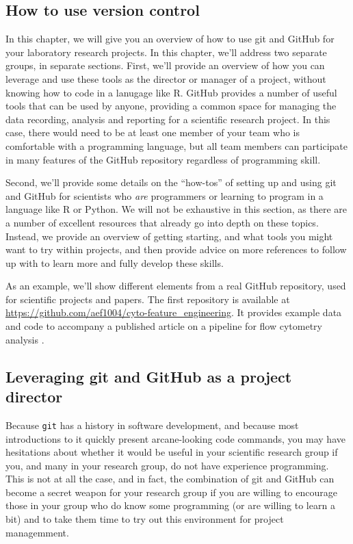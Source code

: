 \documentclass[]{tufte-book}
\begin{document}
\hypertarget{how-to-use-version-control}{%
\subsection{How to use version control}\label{how-to-use-version-control}}

In this chapter, we will give you an overview of how to use git and GitHub
for your laboratory research projects. In this chapter, we'll address two
separate groups, in separate sections. First, we'll provide an overview of how
you can leverage and use these tools as the director or manager of a project,
without knowing how to code in a lanugage like R. GitHub provides a number of
useful tools that can be used by anyone, providing a common space for managing
the data recording, analysis and reporting for a scientific research project.
In this case, there would need to be at least one member of your team who is
comfortable with a programming language, but all team members can participate
in many features of the GitHub repository regardless of programming skill.

Second, we'll provide some details on the ``how-tos'' of setting up and using
git and GitHub for scientists who \emph{are} programmers or learning to program in
a language like R or Python. We will not be exhaustive in this section, as there
are a number of excellent resources that already go into depth on these topics.
Instead, we provide an overview of getting starting, and what tools you might
want to try within projects, and then provide advice on more references to follow
up with to learn more and fully develop these skills.

As an example, we'll show different elements from a real GitHub repository, used
for scientific projects and papers. The first repository is available at
\url{https://github.com/aef1004/cyto-feature_engineering}. It provides example data
and code to accompany a published article on a pipeline for flow cytometry
analysis \citep{fox2020cyto}.

\hypertarget{leveraging-git-and-github-as-a-project-director}{%
\subsection{Leveraging git and GitHub as a project director}\label{leveraging-git-and-github-as-a-project-director}}

Because \texttt{git} has a history in software development, and because most
introductions to it quickly present arcane-looking code commands, you may have
hesitations about whether it would be useful in your scientific research group
if you, and many in your research group, do not have experience programming.
This is not at all the case, and in fact, the combination of git and GitHub can
become a secret weapon for your research group if you are willing to encourage
those in your group who do know some programming (or are willing to learn a bit)
and to take them time to try out this environment for project managemment.
\end{document}
